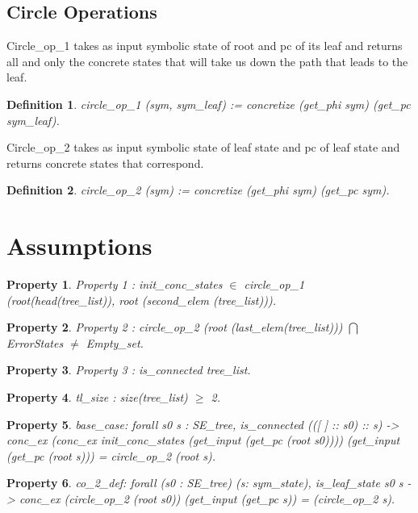 \documentclass[a4paper]{article}
\newtheorem{define}{Definition}
\newtheorem{property}{Property}
\begin{document}
\subsection{Circle Operations}
Circle\_op\_1 takes as input symbolic state of root and pc of its leaf 
and returns all and only the concrete states that will take us down 
the path that leads to the leaf.

\begin{define}
circle\_op\_1 (sym, sym\_leaf) :=
concretize (get\_phi sym) (get\_pc sym\_leaf).
\end{define}

Circle\_op\_2 takes as input symbolic state of leaf state and pc of leaf state 
and returns concrete states that correspond.

\begin{define}
circle\_op\_2 (sym) :=
concretize (get\_phi sym) (get\_pc sym).
\end{define}


\section{Assumptions}
\begin{property}
Property 1 : init\_conc\_states $\in $ circle\_op\_1 (root(head(tree\_list)), root (second\_elem (tree\_list))).
\end{property}

\begin{property}
Property 2 :  circle\_op\_2 (root (last\_elem(tree\_list))) $\bigcap$ ErrorStates
$\neq$ Empty\_set.
\end{property}

\begin{property}
Property 3 :  is\_connected tree\_list.
\end{property}

\begin{property}
tl\_size : size(tree\_list) $\geq$ 2.
\end{property}


\begin{property}
base\_case: 
forall s0 s : SE\_tree,
is\_connected (([ ] :: s0) :: s) ->
conc\_ex
  (conc\_ex init\_conc\_states
     (get\_input (get\_pc (root s0))))
  (get\_input (get\_pc (root s))) =
circle\_op\_2 (root s).
\end{property}

\begin{property}
 co\_2\_def:
forall (s0 : SE\_tree) (s: sym\_state),
is\_leaf\_state s0 s ->
conc\_ex (circle\_op\_2 (root s0))
  (get\_input (get\_pc s)) =
(circle\_op\_2  s).
\end{property}
\end{document}
